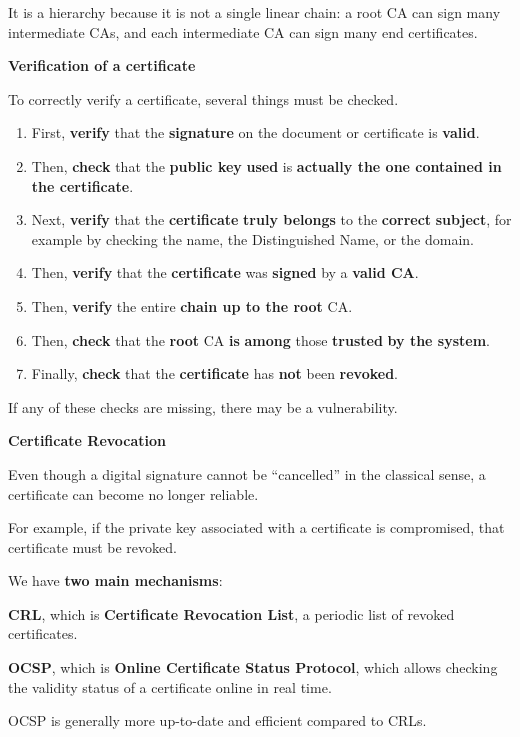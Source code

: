 \documentclass{article}
\begin{document}
It is a hierarchy because it is not a single linear chain: a root CA can sign many intermediate CAs, and each intermediate CA can sign many end certificates.

\textbf{Verification of a certificate}

To correctly verify a certificate, several things must be checked.

\begin{enumerate}
\item First, \textbf{verify} that the \textbf{signature} on the document or certificate is \textbf{valid}.
\item Then, \textbf{check} that the \textbf{public key} \textbf{used} is \textbf{actually the one contained in the certificate}.
\item Next, \textbf{verify} that the \textbf{certificate} \textbf{truly belongs} to the \textbf{correct} \textbf{subject}, for example by checking the name, the Distinguished Name, or the domain.
\item Then, \textbf{verify} that the \textbf{certificate} was \textbf{signed} by a \textbf{valid CA}.
\item Then, \textbf{verify} the entire \textbf{chain up to the root} CA.
\item Then, \textbf{check} that the \textbf{root} CA \textbf{is} \textbf{among} those \textbf{trusted} \textbf{by the system}.
\item Finally, \textbf{check} that the \textbf{certificate} has \textbf{not} been \textbf{revoked}.
\end{enumerate}

If any of these checks are missing, there may be a vulnerability.

\textbf{Certificate Revocation}

Even though a digital signature cannot be ``cancelled'' in the classical sense, a certificate can become no longer reliable.

For example, if the private key associated with a certificate is compromised, that certificate must be revoked.

We have \textbf{two main mechanisms}:

\textbf{CRL}, which is \textbf{Certificate Revocation List}, a periodic list of revoked certificates.

\textbf{OCSP}, which is \textbf{Online Certificate Status Protocol}, which allows checking the validity status of a certificate online in real time.

OCSP is generally more up-to-date and efficient compared to CRLs.
\end{document}
